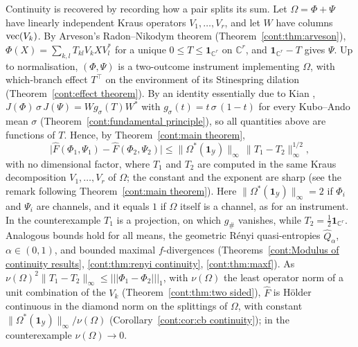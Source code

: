 Continuity is recovered by recording how a pair splits its sum. Let $\Omega=\Phi+\Psi$ have linearly independent Kraus operators $V_1,\dots,V_r$, and let $W$ have columns $\operatorname{vec}(V_k)$. By Arveson's Radon--Nikodym theorem (Theorem~\ref{cont:thm:arveson}), $\Phi(X)=\sum_{k,l}T_{kl}V_kXV_l^*$ for a unique $0\leq T\leq\mathbf{1}_{\mathbb{C}^r}$ on $\mathbb{C}^r$, and $\mathbf{1}_{\mathbb{C}^r}-T$ gives $\Psi$. Up to normalisation, $(\Phi,\Psi)$ is a two-outcome instrument implementing $\Omega$, with which-branch effect $T^\top$ on the environment of its Stinespring dilation (Theorem~\ref{cont:effect theorem}). By an identity essentially due to Kian \cite{kian2026relative}, $J(\Phi)\,\sigma\,J(\Psi)=Wg_\sigma(T)W^*$ with $g_\sigma(t)=t\,\sigma\,(1-t)$ for every Kubo--Ando mean $\sigma$ (Theorem~\ref{cont:fundamental principle}), so all quantities above are functions of $T$. Hence, by Theorem~\ref{cont:main theorem},
\begin{equation}\label{cont:eq:intro fidelity}
\big|\widehat{F}(\Phi_1,\Psi_1)-\widehat{F}(\Phi_2,\Psi_2)\big|\leq\|\Omega^*(\mathbf{1}_{\mathcal{Y}})\|_\infty\,\|T_1-T_2\|_\infty^{1/2},
\end{equation}
with no dimensional factor, where $T_1$ and $T_2$ are computed in the same Kraus decomposition $V_1,\dots,V_r$ of $\Omega$; the constant and the exponent are sharp (see the remark following Theorem~\ref{cont:main theorem}). %
Here $\|\Omega^*(\mathbf{1}_{\mathcal{Y}})\|_\infty=2$ if $\Phi_i$ and $\Psi_i$ are channels, and it equals $1$ if $\Omega$ itself is a channel, as for an instrument. In the counterexample $T_1$ is a projection, on which $g_\#$ vanishes, while $T_2=\frac12\mathbf{1}_{\mathbb{C}^r}$. Analogous bounds hold for all means, the geometric R\'enyi quasi-entropies $\widehat{Q}_\alpha$, $\alpha\in(0,1)$, and bounded maximal $f$-divergences (Theorems~\ref{cont:Modulus of continuity results}, \ref{cont:thm:renyi continuity}, \ref{cont:thm:maxf}). As $\nu(\Omega)^2\|T_1-T_2\|_\infty\leq|||\Phi_1-\Phi_2|||_1$, with $\nu(\Omega)$ the least operator norm of a unit combination of the $V_k$ (Theorem~\ref{cont:thm:two sided}), $\widehat{F}$ is H\"older continuous in the diamond norm on the splittings of $\Omega$, with constant $\|\Omega^*(\mathbf{1}_{\mathcal{Y}})\|_\infty/\nu(\Omega)$ (Corollary~\ref{cont:cor:cb continuity}); in the counterexample $\nu(\Omega)\to0$.

